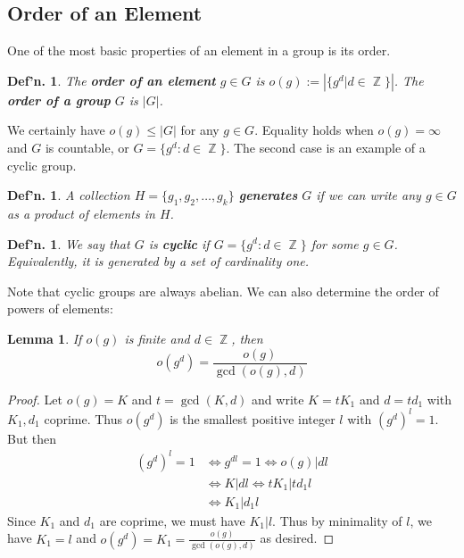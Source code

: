\documentclass[12pt, a4paper]{book}
\DeclareMathOperator{\Z}{\mathbb{Z}}
\newtheorem{lemma}[theorem]{Lemma}
\newtheorem{definition}[theorem]{Def'n.}
\theoremstyle{nonumberplain}
\newtheorem{proof}{Proof}
\begin{document}
\subsection{Order of an Element}
One of the most basic properties of an element in a group is its order.
\begin{definition}
    The \textbf{order of an element} $g\in G$ is $o(g):=\left\lvert\{g^d|d\in\Z\}\right\rvert$.
    The \textbf{order of a group} $G$ is $|G|$.
\end{definition}
We certainly have $o(g)\leq|G|$ for any $g\in G$.
Equality holds when $o(g)=\infty$ and $G$ is countable, or $G=\{g^d:d\in\Z\}$.
The second case is an example of a cyclic group.
\begin{definition}
    A collection $H=\{g_1,g_2,\ldots,g_k\}$ \textbf{generates} $G$ if we can write any $g\in G$ as a product of elements in $H$.
\end{definition}
\begin{definition}
    We say that $G$ is \textbf{cyclic} if $G=\{g^d:d\in\Z\}$ for some $g\in G$.
    Equivalently, it is generated by a set of cardinality one.
\end{definition}
Note that cyclic groups are always abelian.
We can also determine the order of powers of elements:
\begin{lemma}
    If $o(g)$ is finite and $d\in\Z$, then
    \[o(g^d)=\frac{o(g)}{\gcd(o(g),d)}\]
\end{lemma}
\begin{proof}
    Let $o(g)=K$ and $t=\gcd(K,d)$ and write $K=tK_1$ and $d=td_1$ with $K_1,d_1$ coprime.
    Thus $o(g^d)$ is the smallest positive integer $l$ with $(g^d)^l=1$.
    But then
    \begin{align*}
        (g^d)^l=1 &\Leftrightarrow g^{dl}=1 \Leftrightarrow o(g)|dl\\
                  &\Leftrightarrow K|dl\Leftrightarrow tK_1|td_1l\\
                  &\Leftrightarrow K_1|d_1l
    \end{align*}
    Since $K_1$ and $d_1$ are coprime, we must have $K_1|l$.
    Thus by minimality of $l$, we have $K_1=l$ and $o(g^d)=K_1=\frac{o(g)}{\gcd(o(g),d)}$ as desired.
\end{proof}
\end{document}
